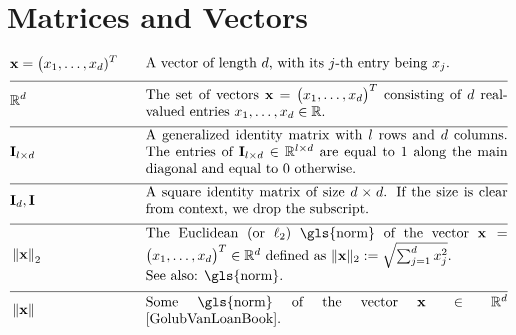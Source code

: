 \section*{Matrices and Vectors} 

\begin{align} 
	 &\featurevec=\big(\feature_{1},\ldots,\feature_{\featuredim})^{T} &\quad & \parbox{.75\textwidth}{A vector of length $\featuredim$, with its 
		$\featureidx$-th entry being $\feature_{\featureidx}$.} \nonumber \\[2mm] \hline \nonumber\\[-5mm]
	&\mathbb{R}^{\featuredim} & \quad &  \parbox{.75\textwidth}{The set of vectors $\featurevec=\big(\feature_{1},\ldots,\feature_{\featurelen}\big)^{T}$ consisting of $\featuredim$ real-valued entries $\feature_{1},\ldots,\feature_{\featurelen} \in \mathbb{R}$.} \nonumber \\[2mm] \hline \nonumber\\[-5mm]
	&\mathbf{I}_{\modelidx \times \featuredim}  & \quad &  \parbox{.75\textwidth}{A generalized identity matrix 
		with $\modelidx$ rows and $\featuredim$ columns. The entries of $\mathbf{I}_{\modelidx \times \featuredim} \in \mathbb{R}^{\modelidx \times \featuredim}$ 
		are equal to $1$ along the main diagonal and equal to $0$ otherwise. }\nonumber \\[2mm] \hline \nonumber\\[-5mm] %
	&\mathbf{I}_{\dimlocalmodel}, \mathbf{I} & \quad &  \parbox{.75\textwidth}{A square identity 
		matrix of size $\dimlocalmodel \times \dimlocalmodel$. If the size is clear from 
		context, we drop the subscript.} \nonumber \\[2mm] \hline \nonumber\\[-5mm]
	&\normgeneric{\featurevec}{2}  &\quad & \parbox{.75\textwidth}{The Euclidean (or $\ell_{2}$) \gls{norm} of the vector 
		$\featurevec=\big(\feature_{1},\ldots,\feature_{\featurelen}\big)^{T} \in \mathbb{R}^{\featuredim}$ defined as 
		$ \| \featurevec \|_{2} \defeq \sqrt{\sum_{\featureidx=1}^{\featuredim} \feature_{\featureidx}^{2}}$.
		\\ See also: \gls{norm}. } \nonumber \\[2mm] \hline \nonumber\\[-5mm] 
	&\normgeneric{\featurevec}{}  & \quad &  \parbox{.75\textwidth}{Some \gls{norm} of the vector $\featurevec \in \mathbb{R}^{\featuredim}$ \cite{GolubVanLoanBook}. 
}
\end{align}
